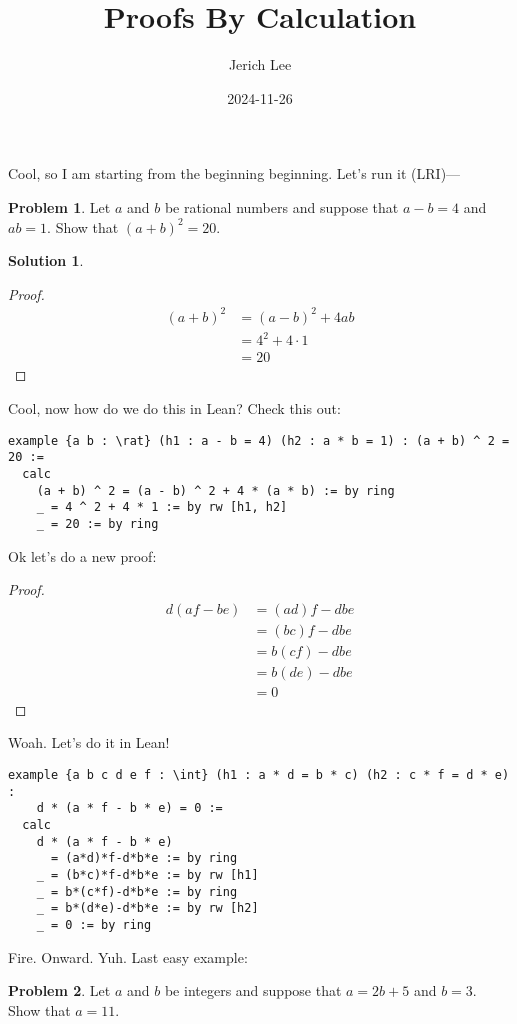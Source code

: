 \documentclass[12pt]{article}
\title{Proofs By Calculation}
\author{Jerich Lee}
\date{2024-11-26}
\theoremstyle{definition} %
\newtheorem{solution}{Solution}
\newtheorem{problem}{Problem}
\theoremstyle{plain} %
\begin{document}
\maketitle
Cool, so I am starting from the beginning beginning. Let's run it (LRI)—

\begin{problem}
   Let $a$ and $b$ be rational numbers and suppose that $a-b=4$ and $ab=1$. Show that $(a+b)^{2}=20$. 
\end{problem}
\begin{solution}
    \begin{proof}
        \begin{align}
            (a+b)^{2}&=(a-b)^{2}+4ab \\[10pt]
           &=4^{2}+4 \cdot 1 \\[10pt] 
           &= 20 
        \end{align}
    \end{proof}
\end{solution}
Cool, now how do we do this in Lean? Check this out:
\begin{lstlisting}
example {a b : \rat} (h1 : a - b = 4) (h2 : a * b = 1) : (a + b) ^ 2 = 20 :=
  calc
    (a + b) ^ 2 = (a - b) ^ 2 + 4 * (a * b) := by ring
    _ = 4 ^ 2 + 4 * 1 := by rw [h1, h2]
    _ = 20 := by ring
\end{lstlisting}
Ok let's do a new proof:
\begin{proof}
    \begin{align}
        d(af-be)&=(ad)f-dbe \\[10pt] 
        &=(bc)f-dbe \\[10pt] 
        &=b(cf)-dbe \\[10pt] 
        &=b(de)-dbe \\[10pt] 
        &=0
    \end{align}
\end{proof}
Woah. Let's do it in Lean!
\begin{lstlisting}
example {a b c d e f : \int} (h1 : a * d = b * c) (h2 : c * f = d * e) :
    d * (a * f - b * e) = 0 :=
  calc
    d * (a * f - b * e)
      = (a*d)*f-d*b*e := by ring
    _ = (b*c)*f-d*b*e := by rw [h1]
    _ = b*(c*f)-d*b*e := by ring
    _ = b*(d*e)-d*b*e := by rw [h2]
    _ = 0 := by ring
\end{lstlisting}
Fire. Onward. Yuh.
Last easy example: 
\begin{problem}
    
Let $a$ and $b$ be integers and suppose that $a=2b+5$ and $b=3$. Show that $a=11$.
\end{problem}
\end{document}
